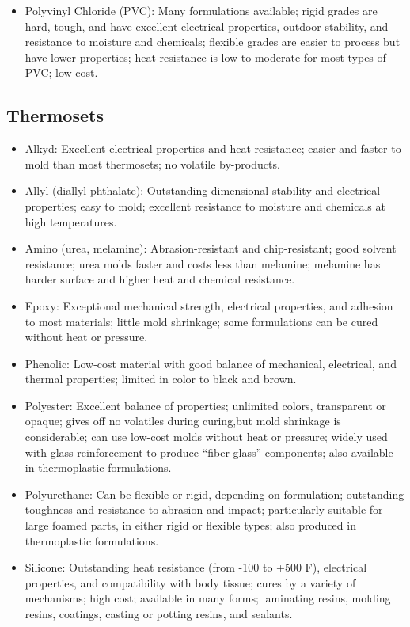 \documentclass[
10pt,
a4paper,
openany,
svgnames,
]{book}
\begin{document}
\begin{itemize}[label=\scriptsize$\square$]
\item Polyvinyl Chloride (PVC): Many formulations available; rigid grades are hard, tough, and have excellent electrical properties, outdoor stability, and resistance to moisture and chemicals; flexible grades are easier to process but have lower properties; heat resistance is low to moderate for most types of PVC; low cost.

\end{itemize}

\subsection{Thermosets}

\begin{itemize}[label=\scriptsize$\square$]
\item Alkyd: Excellent electrical properties and heat resistance; easier and faster to mold than most thermosets; no volatile by-products.

\item Allyl (diallyl phthalate): Outstanding dimensional stability and electrical properties; easy to mold; excellent resistance to moisture and chemicals at high temperatures. 

\item Amino (urea, melamine): Abrasion-resistant and chip-resistant; good solvent resistance; urea molds faster and costs less than melamine; melamine has harder surface and higher heat and chemical resistance.

\item Epoxy: Exceptional mechanical strength, electrical properties, and adhesion to most materials; little mold shrinkage; some formulations can be cured without heat or pressure. 

\item Phenolic: Low-cost material with good balance of mechanical, electrical, and thermal properties; limited in color to black and brown.

\item Polyester: Excellent balance of properties; unlimited colors, transparent or opaque; gives off no volatiles during curing,but mold shrinkage is considerable; can use low-cost molds without heat or pressure; widely used with glass reinforcement to produce “fiber-glass” components; also available in thermoplastic formulations.

\item Polyurethane: Can be flexible or rigid, depending on formulation; outstanding toughness and resistance to abrasion and impact; particularly suitable for large foamed parts, in either rigid or flexible types; also produced in thermoplastic formulations.

\item Silicone: Outstanding heat resistance (from -100 to +500 F), electrical properties, and compatibility with body tissue; cures by a variety of mechanisms; high cost; available in many forms; laminating resins, molding resins, coatings, casting or potting resins, and sealants.
\end{itemize}
\end{document}
